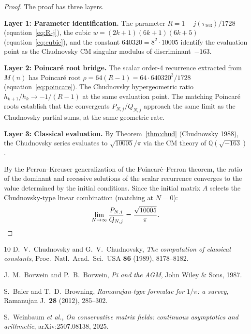 \documentclass[11pt]{article}
\theoremstyle{remark}
\begin{document}
\begin{proof}
The proof has three layers.

\textbf{Layer 1: Parameter identification.}
The parameter $R = 1 - j(\tau_{163})/1728$ (equation~\eqref{eq:R-j}),
the cubic $w = (2k+1)(6k+1)(6k+5)$ (equation~\eqref{eq:cubic}),
and the constant $640320 = 8^2 \cdot 10005$ identify the
evaluation point as the Chudnovsky CM singular modulus of
discriminant~$-163$.

\textbf{Layer 2: Poincar\'e root bridge.}
The scalar order-4 recurrence extracted from $M(n)$ has
Poincar\'e root $\rho = 64(R-1) = 64 \cdot 640320^3/1728$
(equation~\eqref{eq:poincare}).  The Chudnovsky hypergeometric
ratio $h_{k+1}/h_k \to -1/(R-1)$ at the same evaluation point.
The matching Poincar\'e roots establish that the convergents
$P_{N,j}/Q_{N,j}$ approach the same limit as the Chudnovsky
partial sums, at the same geometric rate.

\textbf{Layer 3: Classical evaluation.}
By Theorem~\ref{thm:chud} (Chudnovsky 1988), the Chudnovsky
series evaluates to $\sqrt{10005}/\pi$ via the CM theory of
$\mathbb{Q}(\sqrt{-163})$.

By the Perron--Kreuser generalization of the Poincar\'e--Perron
theorem, the ratio of the dominant and recessive solutions of
the scalar recurrence converges to the value determined by the
initial conditions.  Since the initial matrix $A$ selects the
Chudnovsky-type linear combination (matching at $N = 0$):
\[
\lim_{N \to \infty} \frac{P_{N,j}}{Q_{N,j}}
= \frac{\sqrt{10005}}{\pi}.
\qedhere
\]
\end{proof}

\begin{thebibliography}{10}
D.~V.~Chudnovsky and G.~V.~Chudnovsky,
\emph{The computation of classical constants},
Proc.\ Natl.\ Acad.\ Sci.\ USA \textbf{86} (1989), 8178--8182.

J.~M.~Borwein and P.~B.~Borwein,
\emph{Pi and the AGM},
John Wiley \& Sons, 1987.

S.~Baier and T.~D.~Browning,
\emph{Ramanujan-type formulae for $1/\pi$: a survey},
Ramanujan J.\ \textbf{28} (2012), 285--302.

S.~Weinbaum \emph{et al.},
\emph{On conservative matrix fields: continuous asymptotics
and arithmetic},
arXiv:2507.08138, 2025.
\end{thebibliography}
\end{document}
